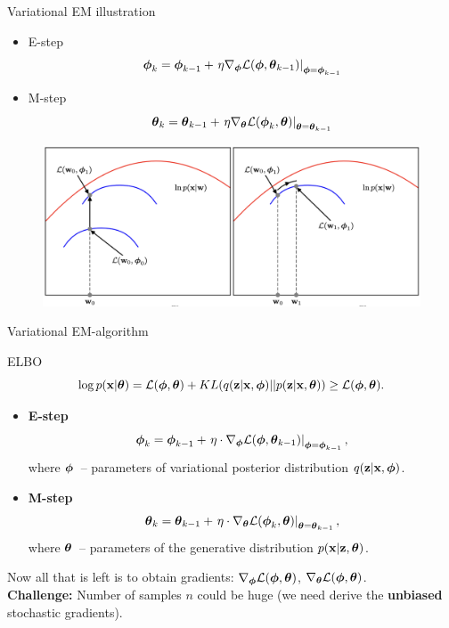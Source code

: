\begin{frame}{Variational EM illustration}
	\begin{itemize}
		\item E-step
		\[
			\boldsymbol{\phi}_k = \boldsymbol{\phi}_{k-1} + \left.\eta \nabla_{\boldsymbol{\phi}} \mathcal{L}(\boldsymbol{\phi}, \boldsymbol{\theta}_{k-1})\right|_{\boldsymbol{\phi}=\boldsymbol{\phi}_{k-1}}
		\]
		\item M-step
		\[
			\boldsymbol{\theta}_k = \boldsymbol{\theta}_{k-1} + \left.\eta \nabla_{\boldsymbol{\theta}} \mathcal{L}(\boldsymbol{\phi}_k, \boldsymbol{\theta})\right|_{\boldsymbol{\theta}=\boldsymbol{\theta}_{k-1}}
		\]
	\end{itemize}
	\begin{figure}
		\includegraphics[width=\linewidth]{figs/em_bishop4}
	\end{figure}
		
\end{frame}
\begin{frame}{Variational EM-algorithm}
	\begin{block}{ELBO}
		\vspace{-0.5cm}
		\[
		\log p(\mathbf{x}| \boldsymbol{\theta}) = \mathcal{L} (\boldsymbol{\phi}, \boldsymbol{\theta}) + KL(q(\mathbf{z} | \mathbf{x}, \boldsymbol{\phi}) || p(\mathbf{z}|\mathbf{x}, \boldsymbol{\theta})) \geq \mathcal{L} (\boldsymbol{\phi}, \boldsymbol{\theta}).
		\]
		\vspace{-0.5cm}
	\end{block}
	\begin{itemize}
		\item \textbf{E-step}
		\[
		\boldsymbol{\phi}_k = \boldsymbol{\phi}_{k-1} + \left.\eta \cdot \nabla_{\boldsymbol{\phi}} \mathcal{L}(\boldsymbol{\phi}, \boldsymbol{\theta}_{k-1})\right|_{\boldsymbol{\phi}=\boldsymbol{\phi}_{k-1}},
		\]
		where $\boldsymbol{\phi}$~-- parameters of variational posterior distribution $q(\mathbf{z} | \mathbf{x}, \boldsymbol{\phi})$.
		\item \textbf{M-step}
		\[
		\boldsymbol{\theta}_k = \boldsymbol{\theta}_{k-1} + \left.\eta \cdot \nabla_{\boldsymbol{\theta}} \mathcal{L}(\boldsymbol{\phi}_k, \boldsymbol{\theta})\right|_{\boldsymbol{\theta}=\boldsymbol{\theta}_{k-1}},
		\]
		where $\boldsymbol{\theta}$~-- parameters of the generative distribution $p(\mathbf{x} | \mathbf{z}, \boldsymbol{\theta})$.
	\end{itemize}
	Now all that is left is to obtain gradients: $\nabla_{\boldsymbol{\phi}} \mathcal{L}(\boldsymbol{\phi}, \boldsymbol{\theta})$, $\nabla_{\boldsymbol{\theta}} \mathcal{L}(\boldsymbol{\phi}, \boldsymbol{\theta})$.  \\
	\textbf{Challenge:} Number of samples $n$ could be huge (we need derive the \textbf{unbiased} stochastic gradients).
\end{frame}
